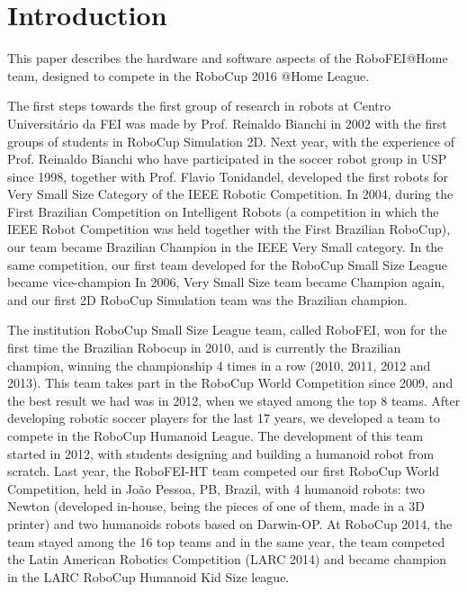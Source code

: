 \section{Introduction}

This paper describes the hardware and software aspects of the RoboFEI@Home team, designed to compete in the RoboCup 2016 @Home League.

The first steps towards the first group of research in robots at Centro Universitário da FEI was made by Prof. Reinaldo Bianchi in 2002 with the first groups of students in RoboCup Simulation 2D. Next year, with the experience of Prof. Reinaldo Bianchi who have participated in the soccer robot group in USP since 1998, together with Prof. Flavio Tonidandel, developed the first robots for Very Small Size Category of the IEEE Robotic Competition. In 2004, during the First Brazilian Competition on Intelligent Robots (a competition in which the IEEE Robot Competition was held together with the First Brazilian RoboCup), our team became Brazilian Champion in the IEEE Very Small category. In the same competition, our first team developed for the RoboCup Small Size League became vice-champion In 2006, Very Small Size team became Champion again, and our first 2D RoboCup Simulation team was the Brazilian champion.

The institution RoboCup Small Size League team, called RoboFEI, won for the first time the Brazilian Robocup in 2010, and is currently the Brazilian champion, winning the championship 4 times in a row (2010, 2011, 2012 and 2013). This team takes part in the RoboCup World Competition since 2009, and the best result we had was in 2012, when we stayed among the top 8 teams. After developing robotic soccer players for the last 17 years, we developed a team to compete in the RoboCup Humanoid League. The development of this team started in 2012, with students designing and building a humanoid robot from scratch. Last year, the RoboFEI-HT team competed our first RoboCup World Competition, held in João Pessoa, PB, Brazil, with 4 humanoid robots: two Newton (developed in-house, being the pieces of one of them, made in a 3D printer) and two humanoids robots based on Darwin-OP. At RoboCup 2014, the team stayed among the 16 top teams and in the same year, the team competed the Latin American Robotics Competition (LARC 2014) and became champion in the LARC RoboCup Humanoid Kid Size league.

